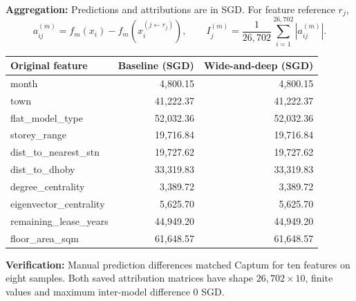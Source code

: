 \documentclass[10pt,a4paper]{article}
\begin{document}
\textbf{Aggregation:} Predictions and attributions are in SGD. For feature reference $r_j$,
\[
a_{ij}^{(m)}=f_m(x_i)-f_m(x_i^{(j\leftarrow r_j)}),\qquad I_j^{(m)}=\frac{1}{26{,}702}\sum_{i=1}^{26{,}702}|a_{ij}^{(m)}|.
\]
\begin{center}\small\begin{tabular}{lrr}\toprule Original feature & Baseline (SGD)&Wide-and-deep (SGD)\\\midrule
month & 4,800.15 & 4,800.15 \\
town & 41,222.37 & 41,222.37 \\
flat\_model\_type & 52,032.36 & 52,032.36 \\
storey\_range & 19,716.84 & 19,716.84 \\
dist\_to\_nearest\_stn & 19,727.62 & 19,727.62 \\
dist\_to\_dhoby & 33,319.83 & 33,319.83 \\
degree\_centrality & 3,389.72 & 3,389.72 \\
eigenvector\_centrality & 5,625.70 & 5,625.70 \\
remaining\_lease\_years & 44,949.20 & 44,949.20 \\
floor\_area\_sqm & 61,648.57 & 61,648.57 \\
\bottomrule\end{tabular}\end{center}

\textbf{Verification:} Manual prediction differences matched Captum for ten features on eight samples. Both saved attribution matrices have shape $26{,}702\times10$, finite values and maximum inter-model difference 0 SGD.
\end{document}
